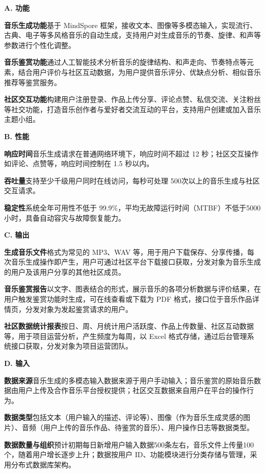 \documentclass{base}
\numberwithin{figure}{section} %
\begin{document}
\textbf{A. 功能}

\textbf{音乐生成功能}\quad 基于 MindSpore 框架，接收文本、图像等多模态输入，实现流行、古典、电子等多风格音乐的自动生成，支持用户对生成音乐的节奏、旋律、和声等参数进行个性化调整。

\textbf{音乐鉴赏功能}\quad 通过人工智能技术分析音乐的旋律结构、和声走向、节奏特点等元素，结合用户评价与社区互动数据，为用户提供音乐评分、优缺点分析、相似音乐推荐等鉴赏服务。​

\textbf{社区交互功能}\quad 构建用户注册登录、作品上传分享、评论点赞、私信交流、关注粉丝等社交功能，打造音乐创作者与爱好者交流互动的平台，支持用户创建或加入音乐主题小组。

\textbf{B. 性能}

\textbf{响应时间}\quad 音乐生成请求在普通网络环境下，响应时间不超过 12 秒；社区交互操作如评论、点赞等，响应时间控制在 1.5 秒以内。

\textbf{吞吐量}\quad 支持至少千级用户同时在线访问，每秒可处理 500次以上的音乐生成与社区交互请求。

\textbf{稳定性}\quad 系统全年可用性不低于 99.9\%，平均无故障运行时间（MTBF）不低于5000小时，具备自动容灾与故障恢复能力。

\textbf{C. 输出}

\textbf{生成音乐文件}\quad 格式为常见的 MP3、WAV 等，用于用户下载保存、分享传播，每次音乐生成操作即产生，用户可通过社区平台下载接口获取，分发对象为音乐生成的用户及该用户分享的其他社区成员。

\textbf{音乐鉴赏报告}\quad 以文字、图表结合的形式，展示音乐的各项分析数据与评价结果，在用户触发鉴赏功能时生成，可在线查看或下载为 PDF 格式，接口位于音乐作品详情页，分发对象为发起鉴赏请求的用户。​

\textbf{社区数据统计报表}\quad 按日、周、月统计用户活跃度、作品上传数量、社区互动数据等，用于项目运营分析，产生频度为每周，以 Excel 格式存储，通过后台管理系统接口获取，分发对象为项目运营团队。

\textbf{D. 输入}

\textbf{数据来源}\quad 音乐生成的多模态输入数据来源于用户手动输入；音乐鉴赏的原始音乐数据由用户上传及合作音乐平台授权提供；社区交互数据来自用户在平台的操作行为。​

\textbf{数据类型}\quad 包括文本（用户输入的描述、评论等）、图像（作为音乐生成灵感的图片）、音频（用户上传的音乐作品、待鉴赏的音乐）、用户操作日志等数据类型。​

\textbf{数据数量与组织}\quad 预计初期每日新增用户输入数据500条左右，音乐文件上传量100个，随着用户增长逐步上升；数据按用户 ID、功能模块进行分类存储与管理，采用分布式数据库架构。
\end{document}
